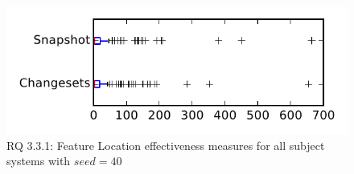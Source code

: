 
\begin{figure}
\centering
\includegraphics[height=0.4\textheight]{figures/flt_seed/rq1_tiny_40}
\caption{RQ 3.3.1: Feature Location effectiveness measures for all subject systems with $seed=40$}
\label{fig:flt_seed:rq1:tiny}
\end{figure}
